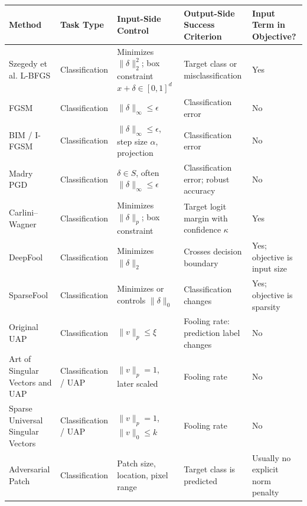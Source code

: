 \documentclass{article}
\begin{document}
\begin{table}[h]
\centering
\small
\begin{tabular}{p{3.2cm} p{2.5cm} p{3.5cm} p{3.5cm} p{2.7cm}}
\hline
\textbf{Method} & \textbf{Task Type} & \textbf{Input-Side Control} & \textbf{Output-Side Success Criterion} & \textbf{Input Term in Objective?} \\
\hline
Szegedy et al. L-BFGS
&
Classification
&
Minimizes \(\|\delta\|_2^2\); box constraint \(x+\delta\in[0,1]^d\)
&
Target class or misclassification
&
Yes
\\

FGSM
&
Classification
&
\(\|\delta\|_\infty\leq \epsilon\)
&
Classification error
&
No
\\

BIM / I-FGSM
&
Classification
&
\(\|\delta\|_\infty\leq \epsilon\), step size \(\alpha\), projection
&
Classification error
&
No
\\

Madry PGD
&
Classification
&
\(\delta\in S\), often \(\|\delta\|_\infty\leq \epsilon\)
&
Classification error; robust accuracy
&
No
\\

Carlini--Wagner
&
Classification
&
Minimizes \(\|\delta\|_p\); box constraint
&
Target logit margin with confidence \(\kappa\)
&
Yes
\\

DeepFool
&
Classification
&
Minimizes \(\|\delta\|_2\)
&
Crosses decision boundary
&
Yes; objective is input size
\\

SparseFool
&
Classification
&
Minimizes or controls \(\|\delta\|_0\)
&
Classification changes
&
Yes; objective is sparsity
\\

Original UAP
&
Classification
&
\(\|v\|_p\leq \xi\)
&
Fooling rate: prediction label changes
&
No
\\

Art of Singular Vectors and UAP
&
Classification / UAP
&
\(\|v\|_p=1\), later scaled
&
Fooling rate
&
No
\\

Sparse Universal Singular Vectors
&
Classification / UAP
&
\(\|v\|_p=1\), \(\|v\|_0\leq k\)
&
Fooling rate
&
No
\\

Adversarial Patch
&
Classification
&
Patch size, location, pixel range
&
Target class is predicted
&
Usually no explicit norm penalty
\\


\end{tabular}
\end{table}
\end{document}
